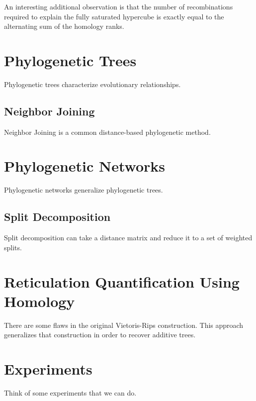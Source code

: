An interesting additional observation is that the number of recombinations required to explain the fully saturated hypercube is exactly equal to the alternating sum of the homology ranks.

\section{Phylogenetic Trees}

Phylogenetic trees characterize evolutionary relationships.
\subsection{Neighbor Joining}

Neighbor Joining is a common distance-based phylogenetic method.

\section{Phylogenetic Networks}

Phylogenetic networks generalize phylogenetic trees.

\subsection{Split Decomposition}

Split decomposition can take a distance matrix and reduce it to a set of weighted splits.

\section{Reticulation Quantification Using Homology}

There are some flaws in the original Vietoris-Rips construction.
This approach generalizes that construction in order to recover additive trees.

\section{Experiments}

Think of some experiments that we can do.
